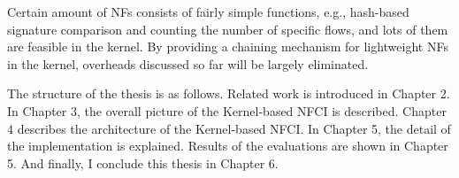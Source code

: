 Certain amount of NFs consists of fairly simple functions, e.g., hash-based signature comparison and counting the number of specific flows,  and lots of them are feasible in the kernel. By providing a chaining mechanism for lightweight NFs in the kernel, overheads discussed so far will be largely eliminated. 

The structure of the thesis is as follows. Related work is introduced in Chapter 2. In Chapter 3, the overall picture of the Kernel-based NFCI is described. Chapter 4 describes the architecture of the Kernel-based NFCI. In Chapter 5, the detail of the implementation is explained. Results of the evaluations are shown in Chapter 5. And finally, I conclude this thesis in Chapter 6. 











